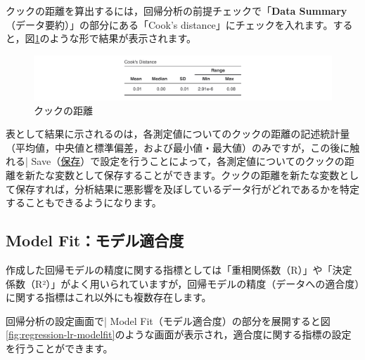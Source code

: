 \documentclass[
  12pt,
  a5jpaper,
  lualatex, ja=standard]{bxjsbook}
\begin{document}
クックの距離を算出するには，回帰分析の前提チェックで「\textbf{Data Summary}（データ要約）」の部分にある「Cook's distance」にチェックを入れます。すると，図\ref{fig:regression-lr-assumption-cook}のような形で結果が表示されます。

\begin{figure}[!ht]

{\centering \includegraphics[width=1\linewidth]{images/regression/lr-assumption-cook} 

}

\caption{クックの距離}\label{fig:regression-lr-assumption-cook}
\end{figure}

表として結果に示されるのは，各測定値についてのクックの距離の記述統計量（平均値，中央値と標準偏差，および最小値・最大値）のみですが，この後に触れる\colorbox{bar}{\textcolor{gmoji2}{| Save}}（\protect\hyperlink{sub:regression-LR-save}{保存}）で設定を行うことによって，各測定値についてのクックの距離を新たな変数として保存することができます。クックの距離を新たな変数として保存すれば，分析結果に悪影響を及ぼしているデータ行がどれであるかを特定することもできるようになります。

\hypertarget{sub:regression-LR-modelfit}{%
\subsection{Model Fit：モデル適合度}\label{sub:regression-LR-modelfit}}

作成した回帰モデルの精度に関する指標としては「重相関係数（R）」や「決定係数（R²）」がよく用いられていますが，回帰モデルの精度（データへの適合度）に関する指標はこれ以外にも複数存在します。

回帰分析の設定画面で\colorbox{bar}{\textcolor{gmoji2}{| Model Fit}}（モデル適合度）の部分を展開すると図\ref{fig:regression-lr-modelfit}のような画面が表示され，適合度に関する指標の設定を行うことができます。
\end{document}
